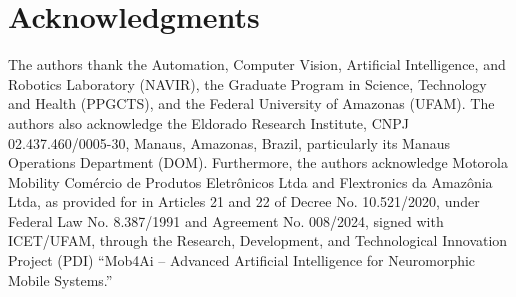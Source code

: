 \section*{Acknowledgments}

The authors thank the Automation, Computer Vision, Artificial Intelligence, and Robotics Laboratory (NAVIR), the Graduate Program in Science, Technology and Health (PPGCTS), and the Federal University of Amazonas (UFAM). The authors also acknowledge the Eldorado Research Institute, CNPJ 02.437.460/0005-30, Manaus, Amazonas, Brazil, particularly its Manaus Operations Department (DOM). Furthermore, the authors acknowledge Motorola Mobility Comércio de Produtos Eletrônicos Ltda and Flextronics da Amazônia Ltda, as provided for in Articles 21 and 22 of Decree No. 10.521/2020, under Federal Law No. 8.387/1991 and Agreement No. 008/2024, signed with ICET/UFAM, through the Research, Development, and Technological Innovation Project (PDI) “Mob4Ai – Advanced Artificial Intelligence for Neuromorphic Mobile Systems.”
